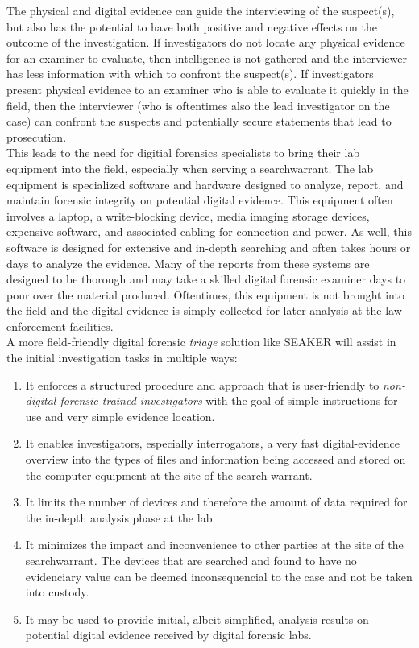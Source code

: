 \documentclass[12pt]{article}
\begin{document}
The physical and digital evidence can guide the interviewing of the suspect(s), but also
has the potential to have both positive and negative effects on the
outcome of the investigation. If investigators do not locate any physical evidence for an examiner
to evaluate, then intelligence is not gathered and the interviewer has less information with which
to confront the suspect(s). If investigators present physical evidence to an examiner who is able to
evaluate it quickly in the field, then the interviewer (who is oftentimes also the lead investigator
on the case) can confront the suspects and potentially secure statements that lead to prosecution.\\

This leads to the need for digitial forensics specialists to bring their lab equipment into the field,
especially when serving a \gls{searchwarrant}.  The lab equipment is specialized software and hardware
designed to analyze, report, and maintain forensic integrity on potential digital evidence.  This
equipment often involves a laptop, a write-blocking device, media imaging storage devices, expensive
software, and associated cabling for connection and power.  As well, this software is designed for
extensive and in-depth searching and often takes hours or days to analyze the evidence.  Many of the
reports from these systems are designed to be thorough and may take a skilled digital forensic
examiner days to pour over the material produced.  Oftentimes, this equipment is not brought
into the field and the digital evidence is simply collected for later analysis at the law
enforcement facilities.\\

A more field-friendly digital forensic {\em triage} solution like SEAKER will assist in the initial
investigation tasks in multiple ways:
\begin{enumerate}
  \item It enforces a structured procedure and approach that is user-friendly to {\em non-digital
  forensic trained investigators} with the goal of simple instructions for use and very simple 
  evidence location.
  \item It enables investigators, especially interrogators, a very fast digital-evidence overview
  into the types of files
  and information being accessed and stored on the computer equipment at the site of the search
  warrant.
  \item It limits the number of devices and therefore the amount of data required for the in-depth
  analysis phase at the lab.
  \item It minimizes the impact and inconvenience to other parties at the site of the 
  \gls{searchwarrant}.  The devices that are searched and found to have no evidenciary value can be
  deemed inconsequencial to the case and not be taken into custody.
  \item It may be used to provide initial, albeit simplified, analysis results on potential
  digital evidence received by digital forensic labs.
\end{enumerate}
\end{document}

